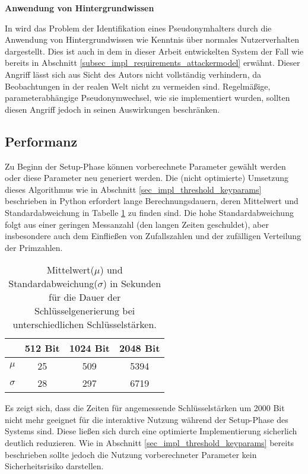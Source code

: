 
\textbf{Anwendung von Hintergrundwissen}

In \cite{lundin1999privacy} wird das Problem der Identifikation eines Pseudonymhalters durch die Anwendung von Hintergrundwissen wie Kenntnis über normales Nutzerverhalten dargestellt. Dies ist auch in dem in dieser Arbeit entwickelten System der Fall wie bereits in Abschnitt \ref{subsec_impl_requirements_attackermodel} erwähnt. Dieser Angriff lässt sich aus Sicht des Autors nicht vollständig verhindern, da Beobachtungen in der realen Welt nicht zu vermeiden sind.
Regelmäßige, parameterabhängige Pseudonymwechsel, wie sie implementiert wurden, sollten diesen Angriff jedoch in seinen Auswirkungen beschränken.



\subsection{Performanz}

Zu Beginn der Setup-Phase können vorberechnete Parameter gewählt werden oder diese Parameter neu generiert werden. Die (nicht optimierte) Umsetzung dieses Algorithmus wie in Abschnitt \ref{sec_impl_threshold_keyparams} beschrieben in Python erfordert lange Berechnungsdauern, deren Mittelwert und Standardabweichung in Tabelle \ref{tab_key_generation} zu finden sind. Die hohe Standardabweichung folgt aus einer geringen Messanzahl (den langen Zeiten geschuldet), aber insbesondere auch dem Einfließen von Zufallszahlen und der zufälligen Verteilung der Primzahlen. 

\begin{table}
  \centering
  \begin{tabular}{|c|c|c|c|}
  \hline 
   & \textbf{512 Bit} & \textbf{1024 Bit} & \textbf{2048 Bit }\\ 
  \hline 
  \(\mu\) & 25  & 509 & 5394 \\ 
  \hline 
  \(\sigma\) & 28  & 297 & 6719 \\ 
  \hline 
  \end{tabular} 
  \caption{Mittelwert(\(\mu\)) und Standardabweichung(\(\sigma\)) in Sekunden für die Dauer der Schlüsselgenerierung bei unterschiedlichen Schlüsselstärken.}
  \label{tab_key_generation}
\end{table}

Es zeigt sich, dass die Zeiten für angemessende Schlüsselstärken um 2000 Bit nicht mehr geeignet für die interaktive Nutzung während der Setup-Phase des Systems sind. Diese ließen sich durch eine optimierte Implementierung sicherlich deutlich reduzieren. Wie in Abschnitt \ref{sec_impl_threshold_keyparams} bereits beschrieben sollte jedoch die Nutzung vorberechneter Parameter kein Sicherheitsrisiko darstellen. 

